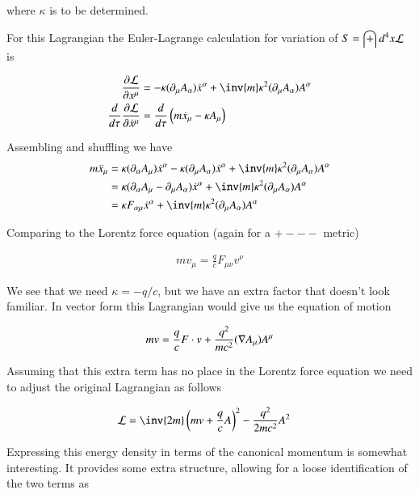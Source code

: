 \documentclass{article}
\begin{document}
where $\kappa$ is to be determined.

For this Lagrangian the Euler-Lagrange calculation for variation of $S = \int d^4 x \mathcal{L}$ is

\begin{align*}
\PD{x^\mu}{\LL}
&= - \kappa (\partial_\mu A_\alpha) \xdot^\alpha + \inv{m} \kappa^2 (\partial_\mu A_\alpha) A^\alpha \\
\frac{d}{d\tau} \PD{\xdot^\mu}{\LL} 
&= \frac{d}{d\tau} \left(m \xdot_\mu - \kappa A_\mu \right)
\end{align*}

Assembling and shuffling we have
\begin{align*}
m \xddot_\mu
&= \kappa (\partial_\alpha A_\mu) \xdot^\alpha
- \kappa (\partial_\mu A_\alpha) \xdot^\alpha + \inv{m} \kappa^2 (\partial_\mu A_\alpha) A^\alpha \\
&= \kappa (\partial_\alpha A_\mu - \partial_\mu A_\alpha) \xdot^\alpha + \inv{m} \kappa^2 (\partial_\mu A_\alpha) A^\alpha \\
&= \kappa F_{\alpha\mu} \xdot^\alpha + \inv{m} \kappa^2 (\partial_\mu A_\alpha) A^\alpha \\
\end{align*}

Comparing to the Lorentz force equation (again for a $+---$ metric)

\begin{align*}
m v_\mu = \frac{q}{c} F_{\mu\nu} v^\nu
\end{align*}

We see that we need $\kappa = -q/c$, but we have an extra factor that doesn't look familiar.  In vector form this Lagrangian would give us the
equation of motion

\begin{align*}
m v = \frac{q}{c} F \cdot v + \frac{q^2}{m c^2} (\nabla A_\mu) A^\mu
\end{align*}

Assuming that this extra term has no place in the Lorentz force equation we need to adjust the original Lagrangian as follows

\begin{align}
\LL
&= \inv{2 m}\left( m v + \frac{q}{c} A \right)^2 - \frac{q^2}{ 2 m c^2} A^2
\end{align}

Expressing this energy density in terms of the canonical momentum is 
somewhat interesting.  It provides some extra structure, allowing for a loose identification of the two terms as
\end{document}
